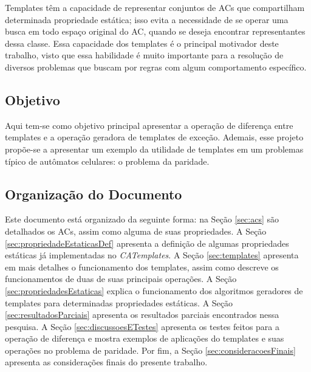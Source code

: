 Templates têm a capacidade de representar conjuntos de ACs que compartilham determinada propriedade estática; isso evita a necessidade de se operar uma busca em todo espaço original do AC, quando se deseja encontrar representantes dessa classe. Essa capacidade dos templates é o principal motivador deste trabalho, visto que essa habilidade é muito importante para a resolução de diversos problemas que buscam por regras com algum comportamento específico.

\subsection{Objetivo}%
Aqui tem-se como objetivo principal apresentar a operação de diferença entre templates e a operação geradora de templates de exceção. Ademais, esse projeto propõe-se a apresentar um exemplo da utilidade de templates em um problemas típico de autômatos celulares: o problema da paridade.

\subsection{Organização do Documento}
Este documento está organizado da seguinte forma: na Seção \ref{sec:acs} são detalhados os ACs, assim como alguma de suas propriedades. A Seção \ref{sec:propriedadeEstaticasDef} apresenta a definição de  algumas propriedades estáticas já implementadas no \textit{CATemplates}. A Seção \ref{sec:templates} apresenta em mais detalhes o funcionamento dos templates, assim como descreve os funcionamentos de duas de suas principais operações. A Seção \ref{sec:propriedadesEstaticas} explica o funcionamento dos algoritmos geradores de templates para determinadas propriedades estáticas. A Seção \ref{sec:resultadosParciais} apresenta os resultados parciais encontrados nessa pesquisa. A Seção \ref{sec:discussoesETestes} apresenta os testes feitos para a operação de diferença e mostra exemplos de aplicações do templates e  suas operações no problema de paridade. Por fim, a Seção \ref{sec:consideracoesFinais} apresenta as considerações finais do presente trabalho.